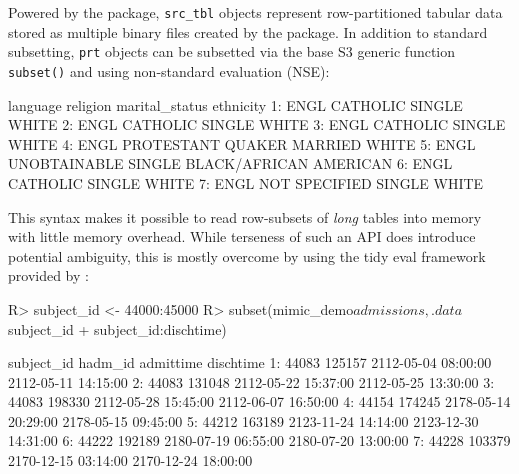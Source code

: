 \documentclass[
  notitle]{jss}
\begin{document}
Powered by the  \citep{bennett2021} package, \texttt{src\_tbl}
objects represent row-partitioned tabular data stored as multiple binary
files created by the  \citep{klik2020} package. In addition to
standard subsetting, \texttt{prt} objects can be subsetted via the base
 S3 generic function \texttt{subset()} and using
non-standard evaluation (NSE):

\begin{CodeChunk}
\begin{CodeOutput}
   language          religion marital_status              ethnicity
1:     ENGL          CATHOLIC         SINGLE                  WHITE
2:     ENGL          CATHOLIC         SINGLE                  WHITE
3:     ENGL          CATHOLIC         SINGLE                  WHITE
4:     ENGL PROTESTANT QUAKER        MARRIED                  WHITE
5:     ENGL      UNOBTAINABLE         SINGLE BLACK/AFRICAN AMERICAN
6:     ENGL          CATHOLIC         SINGLE                  WHITE
7:     ENGL     NOT SPECIFIED         SINGLE                  WHITE
\end{CodeOutput}
\end{CodeChunk}

This syntax makes it possible to read row-subsets of \emph{long} tables
into memory with little memory overhead. While terseness of such an API
does introduce potential ambiguity, this is mostly overcome by using the
tidy eval framework provided by  \citep{wickham2020}:

\begin{CodeChunk}
\begin{CodeInput}
R> subject_id <- 44000:45000
R> subset(mimic_demo$admissions, .data$subject_id %
+        subject_id:dischtime)
\end{CodeInput}
\begin{CodeOutput}
   subject_id hadm_id           admittime           dischtime
1:      44083  125157 2112-05-04 08:00:00 2112-05-11 14:15:00
2:      44083  131048 2112-05-22 15:37:00 2112-05-25 13:30:00
3:      44083  198330 2112-05-28 15:45:00 2112-06-07 16:50:00
4:      44154  174245 2178-05-14 20:29:00 2178-05-15 09:45:00
5:      44212  163189 2123-11-24 14:14:00 2123-12-30 14:31:00
6:      44222  192189 2180-07-19 06:55:00 2180-07-20 13:00:00
7:      44228  103379 2170-12-15 03:14:00 2170-12-24 18:00:00
\end{CodeOutput}
\end{CodeChunk}
\end{document}
